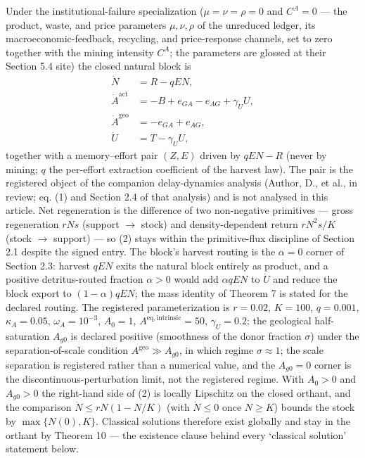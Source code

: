 \documentclass[11pt]{article}
\begin{document}
Under the institutional-failure specialization (\(\mu = \nu = \rho = 0\)
and \(C^A = 0\) --- the product, waste, and price parameters
\(\mu, \nu, \rho\) of the unreduced ledger, its macroeconomic-feedback,
recycling, and price-response channels, set to zero together with the
mining intensity \(C^A\); the parameters are glossed at their Section
5.4 site) the closed natural block is \[\begin{aligned}
\dot N &= R - qEN, \\
\dot A^{\mathrm{act}} &= -B + e_{GA} - e_{AG} + \gamma_U U, \\
\dot A^{\mathrm{geo}} &= -e_{GA} + e_{AG}, \\
\dot U &= T - \gamma_U U,
\end{aligned} \tag{2}\] together with a memory--effort pair \((Z, E)\)
driven by \(qEN - R\) (never by mining; \(q\) the per-effort extraction
coefficient of the harvest law). The pair is the registered object of
the companion delay-dynamics analysis (Author, D., et al., in review;
eq. (1) and Section 2.4 of that analysis) and is not analysed in this
article. Net regeneration is the difference of two non-negative
primitives --- gross regeneration \(rNs\) (support \(\to\) stock) and
density-dependent return \(rN^2 s/K\) (stock \(\to\) support) --- so (2)
stays within the primitive-flux discipline of Section 2.1 despite the
signed entry. The block's harvest routing is the \(\alpha = 0\) corner
of Section 2.3: harvest \(qEN\) exits the natural block entirely as
product, and a positive detritus-routed fraction \(\alpha > 0\) would
add \(\alpha qEN\) to \(\dot U\) and reduce the block export to
\((1-\alpha)qEN\); the mass identity of Theorem 7 is stated for the
declared routing. The registered parameterization is \(r = 0.02\),
\(K = 100\), \(q = 0.001\), \(\kappa_A = 0.05\), \(\omega_A = 10^{-3}\),
\(A_0 = 1\), \(A^{\mathrm{eq,intrinsic}} = 50\), \(\gamma_U = 0.2\); the
geological half-saturation \(A_{g0}\) is declared positive (smoothness
of the donor fraction \(\sigma\)) under the separation-of-scale
condition \(A^{\mathrm{geo}} \gg A_{g0}\), in which regime
\(\sigma \approx 1\); the scale separation is registered rather than a
numerical value, and the \(A_{g0} = 0\) corner is the
discontinuous-perturbation limit, not the registered regime. With
\(A_0 > 0\) and \(A_{g0} > 0\) the right-hand side of (2) is locally
Lipschitz on the closed orthant, and the comparison
\(\dot N \le rN(1 - N/K)\) (with \(\dot N \le 0\) once \(N \ge K\))
bounds the stock by \(\max\{N(0), K\}\). Classical solutions therefore
exist globally and stay in the orthant by Theorem 10 --- the existence
clause behind every `classical solution' statement below.
\end{document}
